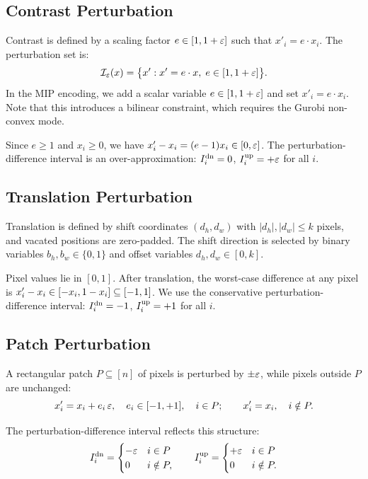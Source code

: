 \subsection{Contrast Perturbation}

Contrast is defined by a scaling factor $e \in [1, 1+\varepsilon]$ such that $x'_i = e \cdot x_i$. The perturbation set is:
\[
  \mathcal{I}_\varepsilon(x) = \bigl\{x' : x' = e\cdot x,\; e \in [1, 1+\varepsilon]\bigr\}.
\]
In the MIP encoding, we add a scalar variable $e \in [1,1+\varepsilon]$ and set $x'_i = e \cdot x_i$. Note that this introduces a bilinear constraint, which requires the Gurobi non-convex mode.

Since $e \ge 1$ and $x_i \ge 0$, we have $x'_i - x_i = (e-1)x_i \in [0, \varepsilon]$. The perturbation-difference interval is an over-approximation: $I^{\mathrm{dn}}_i = 0$, $I^{\mathrm{up}}_i = +\varepsilon$ for all $i$.

\subsection{Translation Perturbation}

Translation is defined by shift coordinates $(d_h, d_w)$ with $|d_h|, |d_w| \le k$ pixels, and vacated positions are zero-padded. The shift direction is selected by binary variables $b_h, b_w \in \{0,1\}$ and offset variables $d_h, d_w \in [0,k]$.

Pixel values lie in $[0,1]$. After translation, the worst-case difference at any pixel is $x'_i - x_i \in [-x_i, 1-x_i] \subseteq [-1, 1]$. We use the conservative perturbation-difference interval: $I^{\mathrm{dn}}_i = -1$, $I^{\mathrm{up}}_i = +1$ for all $i$.

\subsection{Patch Perturbation}

A rectangular patch $P \subseteq [n]$ of pixels is perturbed by $\pm\varepsilon$, while pixels outside $P$ are unchanged:
\[
  x'_i = x_i + e_i\,\varepsilon, \quad e_i \in [-1, +1], \quad i \in P; \qquad
  x'_i = x_i, \quad i \notin P.
\]

The perturbation-difference interval reflects this structure:
\[
  I^{\mathrm{dn}}_i = \begin{cases}-\varepsilon & i \in P \\ 0 & i \notin P,\end{cases}
  \qquad
  I^{\mathrm{up}}_i = \begin{cases}+\varepsilon & i \in P \\ 0 & i \notin P.\end{cases}
\]

